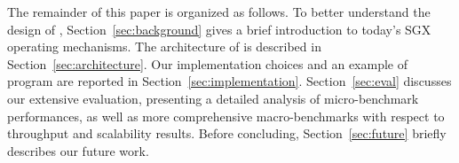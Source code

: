 The remainder of this paper is organized as follows.
To better understand the design of \SYS, Section~\ref{sec:background} gives a brief introduction to today's SGX operating mechanisms.
The architecture of \SYS{} is described in Section~\ref{sec:architecture}.
Our implementation choices and an example of \SYS{} program are reported in Section~\ref{sec:implementation}.
Section~\ref{sec:eval} discusses our extensive evaluation, presenting a detailed analysis of micro-benchmark performances, as well as more comprehensive macro-benchmarks with respect to throughput and scalability results.
Before concluding, Section~\ref{sec:future} briefly describes our future work.

